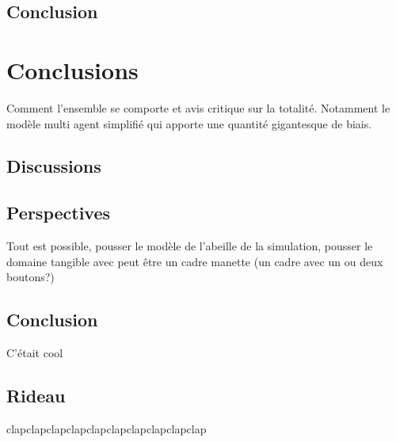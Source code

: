 \documentclass[11pt,a4paper]{report}
\begin{document}
			
	\section*{Conclusion}
	
	
	
	
\chapter{Conclusions}
	Comment l'ensemble se comporte et avis critique sur la totalité. Notamment le modèle multi agent simplifié qui apporte une quantité gigantesque de biais.
\section{Discussions}
	
\section{Perspectives}
	Tout est possible, pousser le modèle de l'abeille de la simulation, pousser le domaine tangible avec peut être un cadre manette (un cadre avec un ou deux boutons?)
\section{Conclusion}
	C'était cool
\section*{Rideau}
	clapclapclapclapclapclapclapclapclapclap
\end{document}
